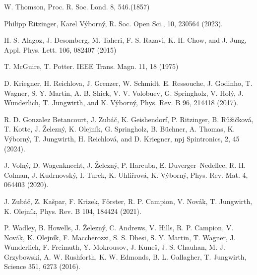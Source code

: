 \documentclass[prb,showpacs,amsmath,amssymb,superscriptaddress,twocolumn,floatfix]{revtex4-1}
\begin{document}
\def\urlprefix{}
\def\url#1{}


\begin{thebibliography}{99}



 W. Thomson, Proc. R. Soc. Lond. 8, 546.(1857) %

 Philipp Ritzinger, Karel V\'yborn\'y, R. Soc. Open Sci., 10, 230564 (2023). %

 H. S. Alagoz, J. Desomberg, M. Taheri, F. S. Razavi, K. H. Chow, and J. Jung, Appl. Phys. Lett. 106, 082407 (2015)

 T. McGuire, T. Potter. IEEE Trans. Magn. 11, 18 (1975) %

 D. Kriegner, H. Reichlova, J. Grenzer, W. Schmidt, E. Ressouche, J. Godinho, T. Wagner, S. Y. Martin, A. B. Shick, V. V. Volobuev, G. Springholz, V. Hol\'{y}, J. Wunderlich, T. Jungwirth, and K. V\'{y}born\'{y}, Phys. Rev. B 96, 214418 (2017). %

 R. D. Gonzalez Betancourt, J. Zub\'a\v{c}, K. Geishendorf, P. Ritzinger, B. R\r{u}\v{z}i\v{c}kov\'a, T. Kotte, J. \v{Z}elezn\'y, K. Olejn\'ik, G. Springholz, B. B\"uchner, A. Thomas, K. V\'yborn\'y, T. Jungwirth, H. Reichlov\'a, and D. Kriegner, npj Spintronics, 2, 45 (2024). %


 J. Voln\'y, D. Wagenknecht, J. \v{Z}elezn\'y, P. Harcuba, E. Duverger–Nedellec, R. H. Colman, J. Kudrnovsk\'y, I. Turek, K. Uhl\'i\v{r}rov\'a, K. V\'yborn\'y, Phys. Rev. Mat. 4, 064403 (2020).%

 J. Zub\'a\v{c}, Z. Ka\v{s}par, F. Krizek, F\"orster, R. P. Campion, V. Nov\'ak, T. Jungwirth, K. Olejn\'ik, Phys. Rev. B 104, 184424 (2021). %

 P. Wadley, B. Howells, J. \v{Z}elezn\'y, C. Andrews, V. Hills, R. P. Campion, V. Nov\'ak, K. Olejn\'ik, F. Maccherozzi, S. S. Dhesi, S. Y. Martin, T. Wagner, J. Wunderlich, F. Freimuth, Y. Mokrousov, J. Kune\v{s}, J. S. Chauhan, M. J. Grzybowski, A. W. Rushforth, K. W. Edmonds, B. L. Gallagher, T. Jungwirth, Science 351, 6273 (2016). %


\end{thebibliography}
\end{document}
